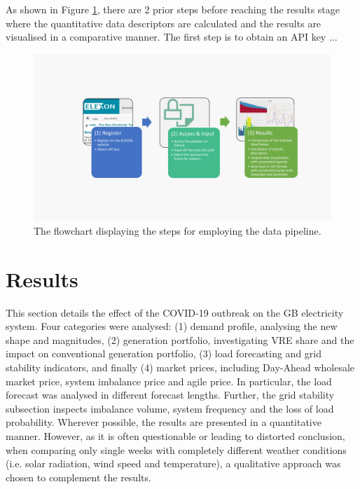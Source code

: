 \documentclass[energies,article,submit,moreauthors,pdftex]{Definitions/mdpi}
\begin{document}
As shown in Figure \ref{fig:pipeline_flowchart}, there are 2 prior steps before reaching the results stage where the quantitative data descriptors are calculated and the results are visualised in a comparative manner. The first step is to obtain an API key ...

\begin{figure}[H]
\centering
\hspace{-25pt}\includegraphics[trim={4cm 2.5cm 3cm 3cm}, clip, width=15 cm]{Graphics/Flowchart_pipeline.pdf}
\caption{The flowchart displaying the steps for employing the data pipeline.}\label{fig:pipeline_flowchart}
\end{figure}  






\section{Results\label{section:Results}}
This section details the effect of the COVID-19 outbreak on the GB electricity system. Four categories were analysed: (1) demand profile, analysing the new shape and magnitudes, (2) generation portfolio, investigating VRE share and the impact on conventional generation portfolio, (3) load forecasting and grid stability indicators, and finally (4) market prices, including Day-Ahead wholesale market price, system imbalance price and agile price. In particular, the load forecast was analysed in different forecast lengths. Further, the grid stability subsection inspects imbalance volume, system frequency and the loss of load probability. Wherever possible, the results are presented in a quantitative manner. However, as it is often questionable or leading to distorted conclusion, when comparing only single weeks with completely different weather conditions (i.e. solar radiation, wind speed and temperature), a qualitative approach was chosen to complement the results.
\end{document}
